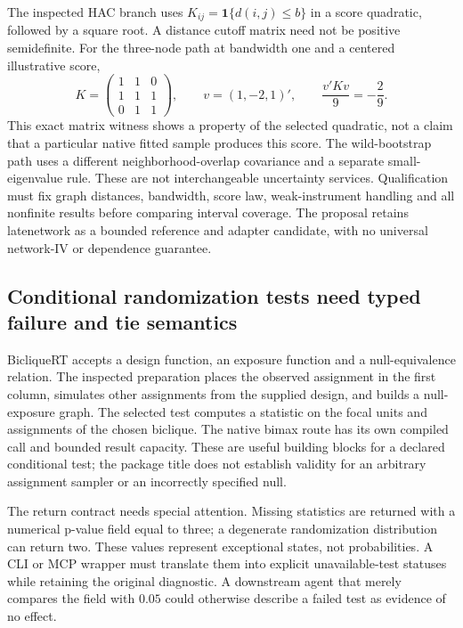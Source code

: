 The inspected HAC branch uses $K_{ij}=\mathbf 1\{d(i,j)\le b\}$ in a score quadratic, followed by a square root. A distance cutoff matrix need not be positive semidefinite. For the three-node path at bandwidth one and a centered illustrative score,
\[
 K=\begin{pmatrix}1&1&0\\1&1&1\\0&1&1\end{pmatrix},
 \qquad v=(1,-2,1)',\qquad \frac{v'Kv}{9}=-\frac{2}{9}.
\]
This exact matrix witness shows a property of the selected quadratic, not a claim that a particular native fitted sample produces this score. The wild-bootstrap path uses a different neighborhood-overlap covariance and a separate small-eigenvalue rule. These are not interchangeable uncertainty services. Qualification must fix graph distances, bandwidth, score law, weak-instrument handling and all nonfinite results before comparing interval coverage. The proposal retains latenetwork as a bounded reference and adapter candidate, with no universal network-IV or dependence guarantee.~\citep{exec25_rnet_late,exec25_rnet_choice}

\subsection{Conditional randomization tests need typed failure and tie semantics}

BicliqueRT accepts a design function, an exposure function and a null-equivalence relation. The inspected preparation places the observed assignment in the first column, simulates other assignments from the supplied design, and builds a null-exposure graph. The selected test computes a statistic on the focal units and assignments of the chosen biclique. The native bimax route has its own compiled call and bounded result capacity. These are useful building blocks for a declared conditional test; the package title does not establish validity for an arbitrary assignment sampler or an incorrectly specified null.~\citep{exec25_rnet_biclique}

The return contract needs special attention. Missing statistics are returned with a numerical p-value field equal to three; a degenerate randomization distribution can return two. These values represent exceptional states, not probabilities. A CLI or MCP wrapper must translate them into explicit unavailable-test statuses while retaining the original diagnostic. A downstream agent that merely compares the field with $0.05$ could otherwise describe a failed test as evidence of no effect.~\citep{exec25_rnet_biclique}

